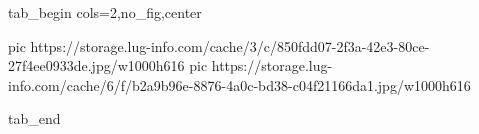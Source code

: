  
 
 
 
 

\ifcmt
  tab_begin cols=2,no_fig,center

     pic https://storage.lug-info.com/cache/3/c/850fdd07-2f3a-42e3-80ce-27f4ee0933de.jpg/w1000h616
		 pic https://storage.lug-info.com/cache/6/f/b2a9b96e-8876-4a0c-bd38-c04f21166da1.jpg/w1000h616

  tab_end
\fi
